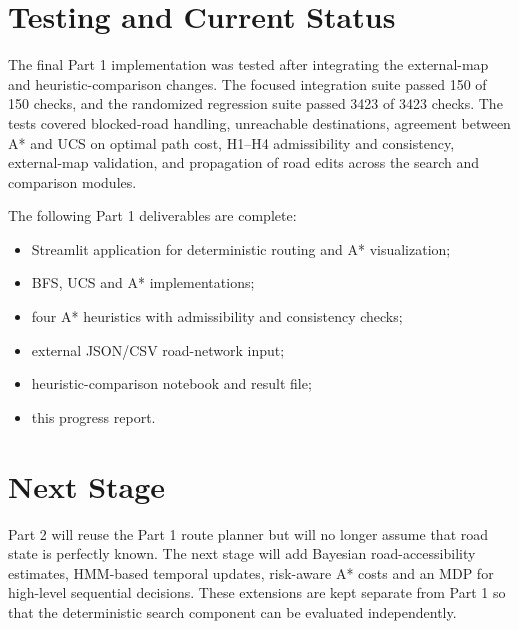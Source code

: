 \documentclass[11pt,a4paper]{article}
\begin{document}
\section{Testing and Current Status}
The final Part 1 implementation was tested after integrating the external-map and heuristic-comparison changes. The focused integration suite passed 150 of 150 checks, and the randomized regression suite passed 3423 of 3423 checks. The tests covered blocked-road handling, unreachable destinations, agreement between A* and UCS on optimal path cost, H1--H4 admissibility and consistency, external-map validation, and propagation of road edits across the search and comparison modules.

The following Part 1 deliverables are complete:
\begin{itemize}
    \item Streamlit application for deterministic routing and A* visualization;
    \item BFS, UCS and A* implementations;
    \item four A* heuristics with admissibility and consistency checks;
    \item external JSON/CSV road-network input;
    \item heuristic-comparison notebook and result file;
    \item this progress report.
\end{itemize}

\section{Next Stage}
Part 2 will reuse the Part 1 route planner but will no longer assume that road state is perfectly known. The next stage will add Bayesian road-accessibility estimates, HMM-based temporal updates, risk-aware A* costs and an MDP for high-level sequential decisions. These extensions are kept separate from Part 1 so that the deterministic search component can be evaluated independently.
\end{document}
